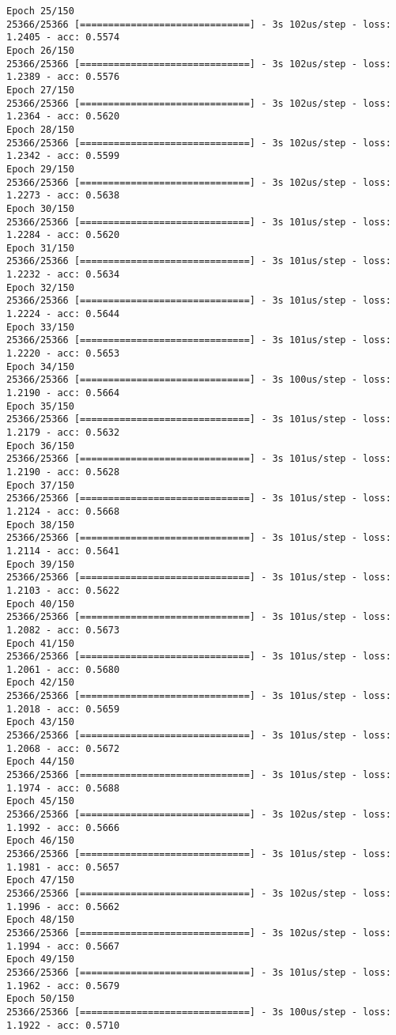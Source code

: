 \documentclass[11pt]{article}
\begin{document}
\begin{Verbatim}[commandchars=\\\{\}]
Epoch 25/150
25366/25366 [==============================] - 3s 102us/step - loss: 1.2405 - acc: 0.5574
Epoch 26/150
25366/25366 [==============================] - 3s 102us/step - loss: 1.2389 - acc: 0.5576
Epoch 27/150
25366/25366 [==============================] - 3s 102us/step - loss: 1.2364 - acc: 0.5620
Epoch 28/150
25366/25366 [==============================] - 3s 102us/step - loss: 1.2342 - acc: 0.5599
Epoch 29/150
25366/25366 [==============================] - 3s 102us/step - loss: 1.2273 - acc: 0.5638
Epoch 30/150
25366/25366 [==============================] - 3s 101us/step - loss: 1.2284 - acc: 0.5620
Epoch 31/150
25366/25366 [==============================] - 3s 101us/step - loss: 1.2232 - acc: 0.5634
Epoch 32/150
25366/25366 [==============================] - 3s 101us/step - loss: 1.2224 - acc: 0.5644
Epoch 33/150
25366/25366 [==============================] - 3s 101us/step - loss: 1.2220 - acc: 0.5653
Epoch 34/150
25366/25366 [==============================] - 3s 100us/step - loss: 1.2190 - acc: 0.5664
Epoch 35/150
25366/25366 [==============================] - 3s 101us/step - loss: 1.2179 - acc: 0.5632
Epoch 36/150
25366/25366 [==============================] - 3s 101us/step - loss: 1.2190 - acc: 0.5628
Epoch 37/150
25366/25366 [==============================] - 3s 101us/step - loss: 1.2124 - acc: 0.5668
Epoch 38/150
25366/25366 [==============================] - 3s 101us/step - loss: 1.2114 - acc: 0.5641
Epoch 39/150
25366/25366 [==============================] - 3s 101us/step - loss: 1.2103 - acc: 0.5622
Epoch 40/150
25366/25366 [==============================] - 3s 101us/step - loss: 1.2082 - acc: 0.5673
Epoch 41/150
25366/25366 [==============================] - 3s 101us/step - loss: 1.2061 - acc: 0.5680
Epoch 42/150
25366/25366 [==============================] - 3s 101us/step - loss: 1.2018 - acc: 0.5659
Epoch 43/150
25366/25366 [==============================] - 3s 101us/step - loss: 1.2068 - acc: 0.5672
Epoch 44/150
25366/25366 [==============================] - 3s 101us/step - loss: 1.1974 - acc: 0.5688
Epoch 45/150
25366/25366 [==============================] - 3s 102us/step - loss: 1.1992 - acc: 0.5666
Epoch 46/150
25366/25366 [==============================] - 3s 101us/step - loss: 1.1981 - acc: 0.5657
Epoch 47/150
25366/25366 [==============================] - 3s 102us/step - loss: 1.1996 - acc: 0.5662
Epoch 48/150
25366/25366 [==============================] - 3s 102us/step - loss: 1.1994 - acc: 0.5667
Epoch 49/150
25366/25366 [==============================] - 3s 101us/step - loss: 1.1962 - acc: 0.5679
Epoch 50/150
25366/25366 [==============================] - 3s 100us/step - loss: 1.1922 - acc: 0.5710

\end{Verbatim}
\end{document}
